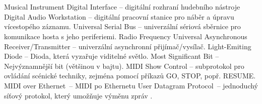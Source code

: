 \cleardoublepage
\chapter*{\listofabbrevname}
{}

\begin{acronym}[KolikMista]
        {Musical Instrument Digital Interface -- digitální rozhraní hudebního nástroje}
        {Digital Audio Workstation -- digitální pracovní stanice pro náběr a úpravu vícestopého záznamu.}
        {Universal Serial Bus -- univerzální sériová sběrnice pro komunikace hosta s jeho periferiemi.}
        {Radio Frequency}
        {Universal Asynchronous Receiver/Transmitter -- univerzální asynchronní přijímač/vysílač.}
        {Light-Emiting Diode -- Dioda, která vyzařuje viditelné světlo.}
        {Most Significant Bit -- Nejvýznamnější bit (většinou v bajtu).}
        {\acs{MIDI} Show Control -- subprotokol pro ovládání scénické techniky, zejména pomocí příkazů GO, STOP, popř. RESUME. \cite{MIDIspecs}}
        {\acs{MIDI} over Ethernet~-- \acs{MIDI} po Ethernetu}
        {User Datagram Protocol~-- jednoduchý síťový protokol, který umožňuje výměnu zpráv  \cite{UDPpaper}.}
%
%

\end{acronym}
